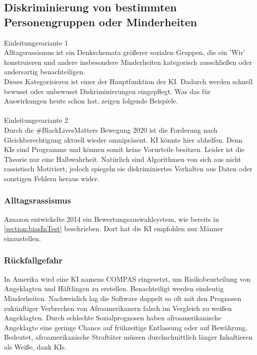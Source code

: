 \documentclass[12pt,oneside,a4paper,parskip]{scrbook}
\begin{document}
\subsection{Diskriminierung von bestimmten Personengruppen oder Minderheiten}
Einleitungsvariante 1 \\
Alltagsrassismus ist ein Denkschemata größerer sozialen Gruppen, die ein 'Wir' konstruieren und andere insbesondere Minderheiten kategorisch ausschließen oder andersartig benachteiligen.\\
Dieses Kategorisieren ist einer der Hauptfunktion der KI. Dadurch werden schnell bewusst oder unbewusst Diskriminierungen eingepflegt. Was das für Auswirkungen heute schon hat, zeigen folgende Beispiele.
\\\\ Einleitungsvariante 2\\
Durch die \#BlackLivesMatters Bewegung 2020 ist die Forderung nach Gleichberechtigung aktuell wieder omnipräsent. KI könnte hier abhelfen. Denn KIs sind Programme und können somit keine Vorurteile besitzen. Leider ist die Theorie nur eine Halbwahrheit. Natürlich sind Algorithmen von sich aus nicht rassistisch Motiviert, jedoch spiegeln sie diskriminiertes Verhalten aus Daten oder sonstigen Fehlern heraus wider.
\subsubsection{Alltagsrassismus}
Amazon entwickelte 2014 ein Bewertungsauswahlsystem, wie bereits in \ref{section:biasInTest} beschrieben. Dort hat die KI empfohlen nur Männer einzustellen. \\
\subsubsection{Rückfallgefahr}
In Amerika wird eine KI namens COMPAS eingesetzt, um Risikobeurteilung von Angeklagten und Häftlingen zu erstellen. Benachteiligt werden eindeutig Minderheiten. Nachweislich lag die Software doppelt so oft mit den Prognosen zukünftiger Verbrechen von Afroamerikanern falsch im Vergleich zu weißen Angeklagten. %
Durch schlechte Sozialprognosen haben afroamerikanische Angeklagte eine geringe Chance auf frühzeitige Entlassung oder auf Bewährung. Bedeutet, afroamerikanische Straftäter müssen durchschnittlich länger Inhaftieren als Weiße, dank KIs.
\end{document}
